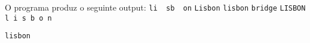 \documentclass[12pt,varwidth=16cm,border=1pt]{standalone}
\begin{document}
O programa produz o seguinte output:
\newline 
\verb+li  sb  on+ \newline
\verb+Lisbon+ \newline
\verb+lisbon+ \verb+bridge+ \newline
\verb+LISBON+ \newline
\verb+l i s b o n + \newline

\verb+lisbon+
\end{document}
